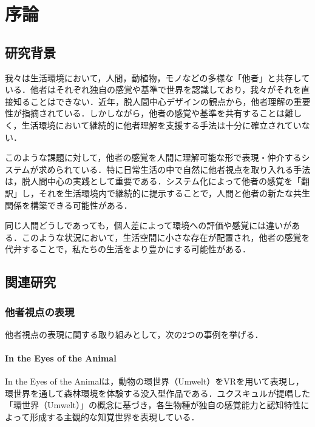 \documentclass{cuxarticle}
\begin{document}
\begin{titlepage}
  
\end{titlepage}

\tableofcontents

\chapter{序論}

\section{研究背景}
我々は生活環境において，人間，動植物，モノなどの多様な「他者」と共存している．他者はそれぞれ独自の感覚や基準で世界を認識しており，我々がそれを直接知ることはできない．近年，脱人間中心デザインの観点から，他者理解の重要性が指摘されている．しかしながら，他者の感覚や基準を共有することは難しく，生活環境において継続的に他者理解を支援する手法は十分に確立されていない．

このような課題に対して，他者の感覚を人間に理解可能な形で表現・仲介するシステムが求められている．特に日常生活の中で自然に他者視点を取り入れる手法は，脱人間中心の実践として重要である．システム化によって他者の感覚を「翻訳」し，それを生活環境内で継続的に提示することで，人間と他者の新たな共生関係を構築できる可能性がある．

同じ人間どうしであっても，個人差によって環境への評価や感覚には違いがある．このような状況において，生活空間に小さな存在が配置され，他者の感覚を代弁することで，私たちの生活をより豊かにする可能性がある．

\section{関連研究}

\subsection{他者視点の表現}
他者視点の表現に関する取り組みとして，次の2つの事例を挙げる．

\subsubsection{In the Eyes of the Animal}
In the Eyes of the Animal\cite{--EyesAnimal}は，動物の環世界（Umwelt）をVRを用いて表現し，環世界を通して森林環境を体験する没入型作品である．ユクスキュルが提唱した「環世界（Umwelt）」の概念に基づき，各生物種が独自の感覚能力と認知特性によって形成する主観的な知覚世界を表現している．
\end{document}
